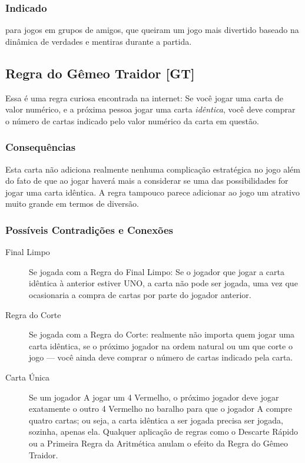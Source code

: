 \subsubsection{Indicado} 

para jogos em grupos de amigos, que queiram um jogo mais divertido baseado na dinâmica de verdades e mentiras durante a partida.

\subsection{Regra do Gêmeo Traidor [GT]}

Essa é uma regra curiosa encontrada na internet: Se você jogar uma carta de valor numérico, e a próxima pessoa jogar uma carta \emph{idêntica}, você deve comprar o número de cartas indicado pelo valor numérico da carta em questão.

\subsubsection{Consequências}

Esta carta não adiciona realmente nenhuma complicação estratégica no jogo além do fato de que ao jogar haverá mais a considerar se uma das possibilidades for jogar uma carta idêntica. A regra tampouco parece adicionar ao jogo um atrativo muito grande em termos de diversão.

\subsubsection{Possíveis Contradições e Conexões}

\begin{description}
\item[Final Limpo]{Se jogada com a Regra do Final Limpo: Se o jogador que jogar a carta idêntica à anterior estiver UNO, a carta não pode ser jogada, uma vez que ocasionaria a compra de cartas por parte do jogador anterior.}
\item[Regra do Corte]{Se jogada com a Regra do Corte: realmente não importa quem jogar uma carta idêntica, se o próximo jogador na ordem natural ou um que corte o jogo --- você ainda deve comprar o número de cartas indicado pela carta.}
\item[Carta Única]{Se um jogador A jogar um 4 Vermelho, o próximo jogador deve jogar exatamente o outro 4 Vermelho no baralho para que o jogador A compre quatro cartas; ou seja, a carta idêntica a ser jogada precisa ser jogada, sozinha, apenas ela. Qualquer aplicação de regras como o Descarte Rápido ou a Primeira Regra da Aritmética anulam o efeito da Regra do Gêmeo Traidor.}
\end{description}

